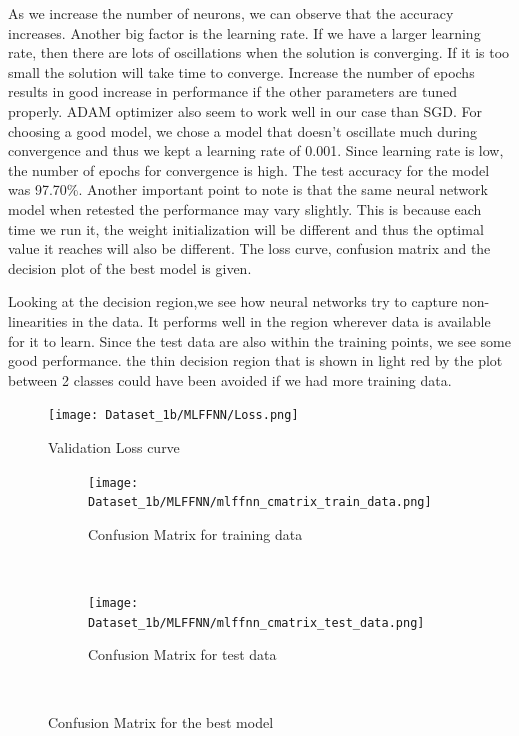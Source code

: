 As we increase the number of neurons, we can observe that the accuracy increases. Another big factor is the learning rate. If we have a larger learning rate, then there are lots of oscillations when the solution is converging. If it is too small the solution will take time to converge. Increase the number of epochs results in good increase in performance if the other parameters are tuned properly. ADAM optimizer also seem to work well in our case than SGD. For choosing a good model, we chose a model that doesn't oscillate much during convergence and thus we kept a learning rate of 0.001. Since learning rate is low, the number of epochs for convergence is high. The test accuracy for the model was 97.70$\%$. Another important point to note is that the same neural network model when retested the performance may vary slightly. This is because each time we run it, the weight initialization will be different and thus the optimal value it reaches will also be different. The loss curve, confusion matrix and the decision plot of the best model is given.

Looking at the decision region,we see how neural networks try to capture non-linearities in the data. It performs well in the region wherever data is available for it to learn. Since the test data are also within the training points, we see some good performance. the thin decision region that is shown in light red by the plot between 2 classes could have been avoided if we had more training data.


\begin{figure}[!ht]
    \centering
    \texttt{[image: Dataset\_1b/MLFFNN/Loss.png]}
    \caption{Validation Loss curve}
    \label{fig:14}
\end{figure}

\begin{figure}[!ht]
    \centering
    \begin{subfigure}[t]{0.5\textwidth}
        \centering
        \texttt{[image: Dataset\_1b/MLFFNN/mlffnn\_cmatrix\_train\_data.png]}
        \caption{Confusion Matrix for training data}
    \end{subfigure}%
    ~ 
    \begin{subfigure}[t]{0.5\textwidth}
        \centering
        \texttt{[image: Dataset\_1b/MLFFNN/mlffnn\_cmatrix\_test\_data.png]}
        \caption{Confusion Matrix for test data}
    \end{subfigure}%
    ~
    \caption{Confusion Matrix for the best model}
    \label{fig:13}
\end{figure}

